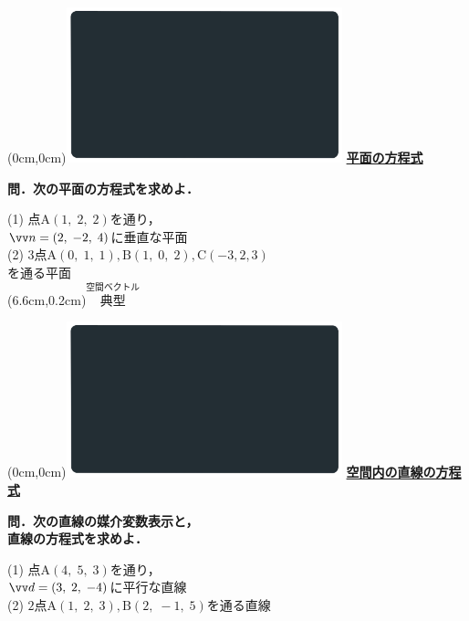 \documentclass[10pt,
fleqn,
dvipdfmx,
uplatex
]{jsarticle}
\begin{document}
\at(0cm,0cm){\includegraphics[width=8cm,bb=0 0 1920 1080]{./media_local/smart_background/空間ベクトル.jpeg}}
{\color{orange}\bf\boldmath\huge\underline{平面の方程式}}\vspace{0.3zw}

\Large 
\bf\boldmath 問．次の平面の方程式を求めよ．

\normalsize
(1)  点$\text{A}\left(1,\;2,\;2\right)$を通り，\\
\hfill$\vv n=\left(2,\;-2,\;4\right)$に垂直な平面\\
(2)  $3$点$\text{A}\left(0,\;1,\;1\right),\text{B}\left(1,\;0,\;2\right),\text{C}\left(-3,2,3\right)$\\
\hfill を通る平面\\

\at(6.6cm,0.2cm){\small\color{bradorange}$\overset{\text{空間ベクトル}}{\text{典型}}$}


\newpage



\at(0cm,0cm){\includegraphics[width=8cm,bb=0 0 1920 1080]{./media_local/smart_background/空間ベクトル.jpeg}}
{\color{orange}\bf\boldmath\Large\underline{空間内の直線の方程式}}\vspace{0.3zw}

\Large 
\bf\boldmath 問．次の直線の媒介変数表示と，\\
\hfill 直線の方程式を求めよ．

\normalsize
(1)  点$\text{A}\left(4,\;5,\;3\right)$を通り，\\
\hfill$\vv d=\left(3,\;2,\;-4\right)$に平行な直線\\
(2)  $2$点$\text{A}\left(1,\;2,\;3\right),\text{B}\left(2,\;-1,\;5\right)$を通る直線\\
\end{document}
